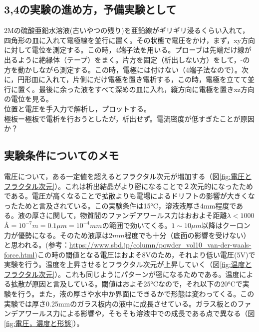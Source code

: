 \documentclass{ltjsarticle}
\begin{document}
\subsection{3,4の実験の進め方，予備実験として}
2Mの硫酸亜鉛水溶液(古いやつの残り)を亜鉛線がギリギリ浸るくらい入れて，四角形の皿に入れて電極線を並行に置く。その状態で電圧をかけ，まず，xy方向に対して電位を測定する。この時，4端子法を用いる。プローブは先端だけ線が出るように絶縁体（テープ）をまく。片方を固定（析出しない方）をして，-の方を動かしながら測定する。この時，電極には付けない（4端子法なので）。次に，円形皿に入れて，片側にだけ電極を置き電析する，この時，電極を立てて並行に置く。最後に余った液をすべて深めの皿に入れ，縦方向に電極を置きxz方向の電位を見る。\\
位置と電圧を手入力で解析し，プロットする。\\
\rightarrow 極板ー極板で電析を行おうとしたが，析出せず。電流密度が低すぎたことが原因か？
\subsection{実験条件についてのメモ}
電圧について，ある一定値を超えるとフラクタル次元が増加する（図\ref{fig:電圧とフラクタル次元}）。これは析出結晶がより密になることで２次元的になったためである\cite{matsushita1984fractal}。電圧が高くなることで拡散よりも電場によるドリフトの影響が大きくなったためと言及されている。この実験条件は15\si{\degreeCelsius}，溶液液厚さ4\si{mm}程度である。液の厚さに関して，物質間のファンデアワールス力はおおよそ距離$\lambda<1000$ \AA $=10^{-7}\si{m}=0.1\si{\mu m}=10^{-4}\si{mm}$の範囲で効いてくる。$1\sim10\si{\mu m}$以降はクーロン力が優勢になる。そのため液厚は$2\si{mm}$程度でも十分（底面の影響を受けない）と思われる\cite{表面張力の物理学}。(参考：\url{https://www.sbd.jp/column/powder_vol10_van-der-waals-force.html})この時の閾値となる電圧はおよそ8Vのため，それより{\color{blue}低い電圧(5V)}で実験を行う。温度を上昇させるとフラクタル次元が上昇していく\cite{suda2003temperature}（図\ref{fig:温度とフラクタル次元}）。これも同じようにパターンが密になるためである。温度による拡散が原因と言及している。閾値はおよそ25\si{\degreeCelsius}なので，それ以下の{\color{blue}20\si{\degreeCelsius}}で実験を行う。また，液の厚さや水中か界面にできるかで形態は変わってくる\cite{sawada1986dendritic}。この実験では厚さ0.25\si{mm}のガラス板内の液中に成長させている。ガラス板とのファンデアワールス力による影響や，そもそも溶液中での成長である点で異なる（図\ref{fig:電圧，濃度と形態}）。
\end{document}
